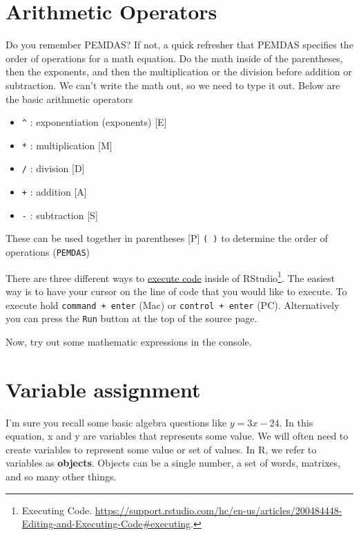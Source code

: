 \documentclass[
]{book}
\providecommand{\tightlist}{%
  \setlength{\itemsep}{0pt}\setlength{\parskip}{0pt}}
\begin{document}
\hypertarget{arithmetic-operators}{%
\section{Arithmetic Operators}\label{arithmetic-operators}}

Do you remember PEMDAS? If not, a quick refresher that PEMDAS specifies the order of operations for a math equation. Do the math inside of the parentheses, then the exponents, and then the multiplication or the division before addition or subtraction. We can't write the math out, so we need to type it out. Below are the basic arithmetic operators

\begin{itemize}
\tightlist
\item
  \texttt{\^{}} : exponentiation (exponents) {[}E{]}
\item
  \texttt{*} : multiplication {[}M{]}
\item
  \texttt{/} : division {[}D{]}
\item
  \texttt{+} : addition {[}A{]}
\item
  \texttt{-} : subtraction {[}S{]}
\end{itemize}

These can be used together in parentheses {[}P{]} \texttt{(\ )} to determine the order of operations (\texttt{PEMDAS})

There are three different ways to \href{https://support.rstudio.com/hc/en-us/articles/200484448-Editing-and-Executing-Code\#executing}{execute code} inside of RStudio\footnote{Executing Code. \url{https://support.rstudio.com/hc/en-us/articles/200484448-Editing-and-Executing-Code\#executing}.}. The easiest way is to have your cursor on the line of code that you would like to execute. To execute hold \texttt{command\ +\ enter} (Mac) or \texttt{control\ +\ enter} (PC). Alternatively you can press the \texttt{Run} button at the top of the source page.

Now, try out some mathematic expressions in the console.

\hypertarget{variable-assignment}{%
\section{Variable assignment}\label{variable-assignment}}

I'm sure you recall some basic algebra questions like \(y = 3x - 24\). In this equation, x and y are variables that represents some value. We will often need to create variables to represent some value or set of values. In R, we refer to variables as \textbf{objects}. Objects can be a single number, a set of words, matrixes, and so many other things.
\end{document}
